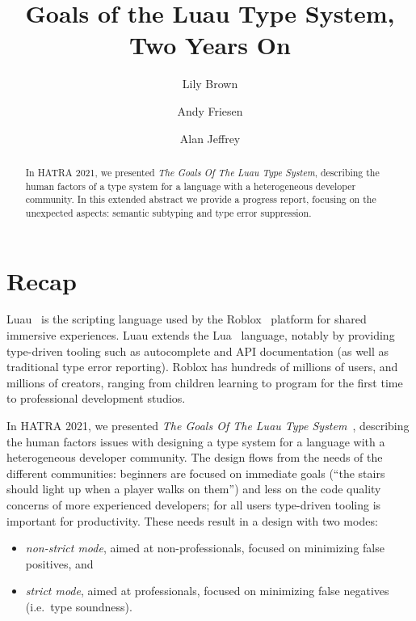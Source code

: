 \documentclass[acmsmall]{acmart}
\begin{document}
\title{Goals of the Luau Type System, Two Years On}

\author{Lily Brown}
\author{Andy Friesen}
\author{Alan Jeffrey}

\begin{abstract}
In HATRA 2021, we presented \emph{The Goals Of The Luau Type System},
describing the human factors of a type system for a
language with a heterogeneous developer community. In this extended
abstract we provide a progress report, focusing on
the unexpected aspects: semantic subtyping and type error
suppression.
\end{abstract}

\maketitle

\section{Recap}

Luau~\cite{Luau} is the scripting language used by the
Roblox~\cite{Roblox} platform for shared immersive experiences.  Luau extends
the Lua~\cite{Lua} language, notably by providing type-driven tooling
such as autocomplete and API documentation (as well as traditional type
error reporting). Roblox has hundreds of millions of users, and
millions of creators, ranging from children learning to program for
the first time to professional development studios.

In HATRA 2021, we presented \emph{The Goals Of The Luau Type
System}~\cite{BFJ21:GoalsLuau}, describing the human factors issues
with designing a type system for a language with a heterogeneous
developer community. The design flows from the needs of the different
communities: beginners are focused on immediate goals (``the stairs
should light up when a player walks on them'') and less on the code
quality concerns of more experienced developers; for all users
type-driven tooling is important for productivity. These needs result in a design with two modes:
\begin{itemize}
\item \emph{non-strict mode}, aimed at non-professionals, focused on
  minimizing false positives, and
\item \emph{strict mode}, aimed at professionals, focused on
  minimizing false negatives (i.e.~type soundness).
\end{itemize}
\end{document}
